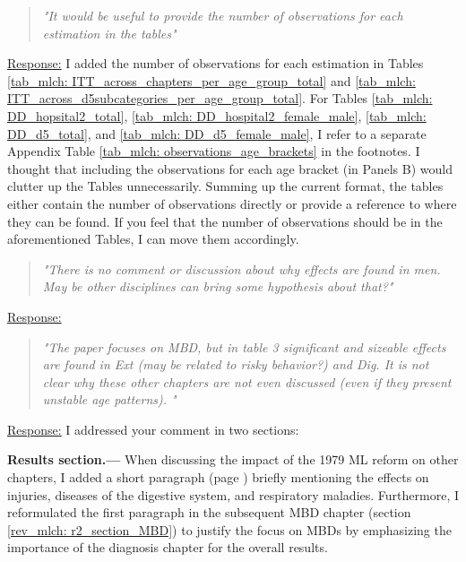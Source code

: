 \begin{quote}
	\textit{"It  would be useful to provide the number of observations for each estimation in the tables"}
\end{quote}
\underline{Response:} I added the number of observations for each estimation in Tables \ref{tab_mlch: ITT_across_chapters_per_age_group_total} and \ref{tab_mlch: ITT_across_d5subcategories_per_age_group_total}. For Tables \ref{tab_mlch: DD_hopsital2_total}, \ref{tab_mlch: DD_hospital2_female_male}, \ref{tab_mlch: DD_d5_total}, and \ref{tab_mlch: DD_d5_female_male}, I refer to a separate Appendix Table \ref{tab_mlch: observations_age_brackets} in the footnotes. I thought that including the observations for each age bracket (in Panels B) would clutter up the Tables unnecessarily. Summing up the current format, the tables either contain the number of observations directly or provide a reference to where they can be found. If you feel that the number of observations should be in the aforementioned Tables, I can move them accordingly.




% 
\begin{quote}
	\textit{"There is no comment or discussion about why effects are found in men. May be other disciplines can bring some hypothesis about that?"}
\end{quote}
\underline{Response:}

\begin{quote}
	\textit{"The paper focuses on MBD, but in table 3 significant and sizeable effects are found in Ext (may be related to risky behavior?) and Dig. It is not clear why these other chapters are not even discussed (even if they present unstable age patterns). "}
\end{quote}
\underline{Response:} I addressed your comment in two sections:

\textbf{Results section.---} When discussing the impact of the 1979 ML reform on other chapters, I added a short paragraph (page \pageref{rev_mlch: r2_results_other chapters}) briefly mentioning the effects on injuries, diseases of the digestive system, and respiratory maladies. Furthermore, I reformulated the first paragraph in the subsequent MBD chapter (section \ref{rev_mlch: r2_section_MBD}) to justify the focus on MBDs by emphasizing the importance of the diagnosis chapter for the overall results.

